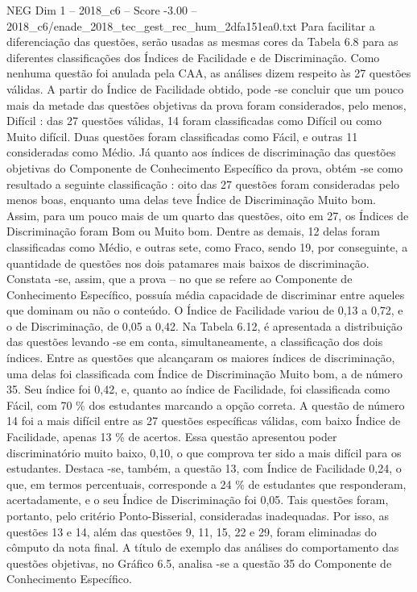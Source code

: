 \begin{textsample}{NEG Dim 1 – 2018\_c6 – Score -3.00 – 2018\_c6/enade\_2018\_tec\_gest\_rec\_hum\_2dfa151ea0.txt}
Para facilitar a diferenciação das questões, serão usadas as mesmas cores da Tabela 6.8 para as diferentes classificações dos Índices de Facilidade e de Discriminação.
Como nenhuma questão foi anulada pela CAA, as análises dizem respeito às 27 questões válidas.
A partir do Índice de Facilidade obtido, pode -se concluir que um pouco mais da metade das questões objetivas da prova foram considerados, pelo menos, Difícil : das 27 questões válidas, 14 foram classificadas como Difícil ou como Muito difícil.
Duas questões foram classificadas como Fácil, e outras 11 consideradas como Médio.
Já quanto aos índices de discriminação das questões objetivas do Componente de Conhecimento Específico da prova, obtém -se como resultado a seguinte classificação : oito das 27 questões foram consideradas pelo menos boas, enquanto uma delas teve Índice de Discriminação Muito bom.
Assim, para um pouco mais de um quarto das questões, oito em 27, os Índices de Discriminação foram Bom ou Muito bom.
Dentre as demais, 12 delas foram classificadas como Médio, e outras sete, como Fraco, sendo 19, por conseguinte, a quantidade de questões nos dois patamares mais baixos de discriminação.
Constata -se, assim, que a prova – no que se refere ao Componente de Conhecimento Específico, possuía média capacidade de discriminar entre aqueles que dominam ou não o conteúdo.
O Índice de Facilidade variou de 0,13 a 0,72, e o de Discriminação, de 0,05 a 0,42.
Na Tabela 6.12, é apresentada a distribuição das questões levando -se em conta, simultaneamente, a classificação dos dois índices.
Entre as questões que alcançaram os maiores índices de discriminação, uma delas foi classificada com Índice de Discriminação Muito bom, a de número 35.
Seu índice foi 0,42, e, quanto ao índice de Facilidade, foi classificada como Fácil, com 70 \% dos estudantes marcando a opção correta.
A questão de número 14 foi a mais difícil entre as 27 questões específicas válidas, com baixo Índice de Facilidade, apenas 13 \% de acertos.
Essa questão apresentou poder discriminatório muito baixo, 0,10, o que comprova ter sido a mais difícil para os estudantes.
Destaca -se, também, a questão 13, com Índice de Facilidade 0,24, o que, em termos percentuais, corresponde a 24 \% de estudantes que responderam, acertadamente, e o seu Índice de Discriminação foi 0,05.
Tais questões foram, portanto, pelo critério Ponto-Bisserial, consideradas inadequadas.
Por isso, as questões 13 e 14, além das questões 9, 11, 15, 22 e 29, foram eliminadas do cômputo da nota final.
A título de exemplo das análises do comportamento das questões objetivas, no Gráfico 6.5, analisa -se a questão 35 do Componente de Conhecimento Específico.

\end{textsample}
